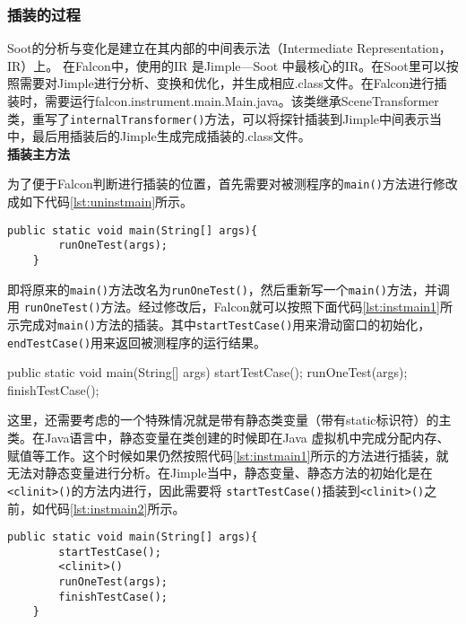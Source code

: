 \subsubsection{插装的过程}\label{sec:InstProcess}
Soot的分析与变化是建立在其内部的中间表示法（Intermediate Representation，IR）上\cite{jnuthesis1}。 在Falcon中，使用的IR 是Jimple---Soot 中最核心的IR。在Soot里可以按照需要对Jimple进行分析、变换和优化，并生成相应.class文件。在Falcon进行插装时，需要运行falcon.instrument.main.Main.java。该类继承SceneTransformer类，重写了\texttt{internalTransformer()}方法，可以将探针插装到Jimple中间表示当中，最后用插装后的Jimple生成完成插装的.class文件。\\
\textbf{插装主方法}\par
为了便于Falcon判断进行插装的位置，首先需要对被测程序的\texttt{main()}方法进行修改成如下代码\ref{lst:uninstmain}所示。
\begin{lstlisting}[language={[AspectJ]Java}, label=lst:uninstmain, caption=未插装的被测程序主方法]
    public static void main(String[] args){
        runOneTest(args);
    }
\end{lstlisting}
即将原来的\texttt{main()}方法改名为\texttt{runOneTest()}，然后重新写一个\texttt{main()}方法，并调用
\texttt{runOneTest()}方法。经过修改后，Falcon就可以按照下面代码\ref{lst:instmain1}所示完成对\texttt{main()}方法的插装。其中\texttt{startTestCase()}用来滑动窗口的初始化，\texttt{endTestCase()}用来返回被测程序的运行结果。\\
\begin{code}[language={[AspectJ]Java}, label=lst:instmain1, caption=插装后的被测程序主方法]
    public static void main(String[] args){
        startTestCase();
        runOneTest(args);
        finishTestCase();
    }
\end{code}\par
这里，还需要考虑的一个特殊情况就是带有静态类变量（带有static标识符）的主类。在Java语言中，静态变量在类创建的时候即在Java 虚拟机中完成分配内存、赋值等工作。这个时候如果仍然按照代码\ref{lst:instmain1}所示的方法进行插装，就无法对静态变量进行分析。在Jimple当中，静态变量、静态方法的初始化是在\texttt{<clinit>()}的方法内进行，因此需要将
\texttt{startTestCase()}插装到\texttt{<clinit>()}之前，如代码\ref{lst:instmain2}所示。
\begin{lstlisting}[language={[AspectJ]Java}, label=lst:instmain2, caption=插装后的带有静态变量的被测程序主方法]
    public static void main(String[] args){
        startTestCase();
        <clinit>()
        runOneTest(args);
        finishTestCase();
    }
\end{lstlisting}\par
